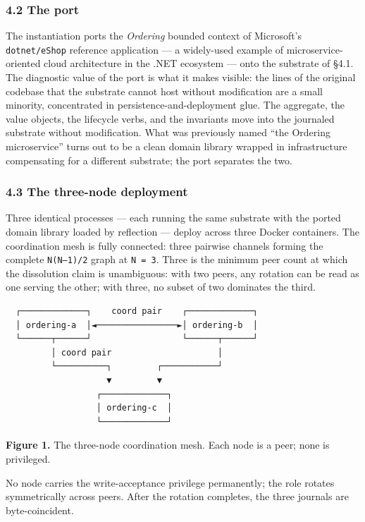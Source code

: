 \documentclass[
]{article}
\newcounter{none} %
\begin{document}
\subsubsection{4.2 The port}\label{the-port}

The instantiation ports the \emph{Ordering} bounded context of
Microsoft's \texttt{dotnet/eShop} reference application --- a
widely-used example of microservice-oriented cloud architecture in the
.NET ecosystem --- onto the substrate of §4.1. The diagnostic value of
the port is what it makes visible: the lines of the original codebase
that the substrate cannot host without modification are a small
minority, concentrated in persistence-and-deployment glue. The
aggregate, the value objects, the lifecycle verbs, and the invariants
move into the journaled substrate without modification. What was
previously named ``the Ordering microservice'' turns out to be a clean
domain library wrapped in infrastructure compensating for a different
substrate; the port separates the two.

\subsubsection{4.3 The three-node
deployment}\label{the-three-node-deployment}

Three identical processes --- each running the same substrate with the
ported domain library loaded by reflection --- deploy across three
Docker containers. The coordination mesh is fully connected: three
pairwise channels forming the complete \texttt{N(N–1)/2} graph at
\texttt{N\ =\ 3}. Three is the minimum peer count at which the
dissolution claim is unambiguous: with two peers, any rotation can be
read as one serving the other; with three, no subset of two dominates
the third.

\begin{verbatim}
  ┌─────────────┐    coord pair    ┌─────────────┐
  │ ordering-a  │◄────────────────►│ ordering-b  │
  └──────┬──────┘                  └──────┬──────┘
         │ coord pair                     │
         └──────────┐         ┌───────────┘
                    ▼         ▼
                  ┌─────────────┐
                  │ ordering-c  │
                  └─────────────┘
\end{verbatim}

\textbf{Figure 1.} The three-node coordination mesh. Each node is a
peer; none is privileged.

No node carries the write-acceptance privilege permanently; the role
rotates symmetrically across peers. After the rotation completes, the
three journals are byte-coincident.
\end{document}
